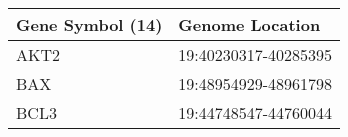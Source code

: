 \begin{tabular}{ll}
\toprule
Gene Symbol (14) &      Genome Location \\
\midrule
            AKT2 & 19:40230317-40285395 \\
             BAX & 19:48954929-48961798 \\
            BCL3 & 19:44748547-44760044 \\
\bottomrule
\end{tabular}
